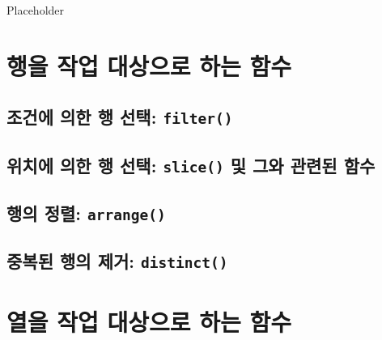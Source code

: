 \documentclass[
]{book}
\begin{document}
Placeholder

\hypertarget{uxd589uxc744-uxc791uxc5c5-uxb300uxc0c1uxc73cuxb85c-uxd558uxb294-uxd568uxc218}{%
\section{행을 작업 대상으로 하는 함수}\label{uxd589uxc744-uxc791uxc5c5-uxb300uxc0c1uxc73cuxb85c-uxd558uxb294-uxd568uxc218}}

\hypertarget{uxc870uxac74uxc5d0-uxc758uxd55c-uxd589-uxc120uxd0dd-filter}{%
\subsection{\texorpdfstring{조건에 의한 행 선택: \texttt{filter()}}{조건에 의한 행 선택: filter()}}\label{uxc870uxac74uxc5d0-uxc758uxd55c-uxd589-uxc120uxd0dd-filter}}

\hypertarget{uxc704uxce58uxc5d0-uxc758uxd55c-uxd589-uxc120uxd0dd-slice-uxbc0f-uxadf8uxc640-uxad00uxb828uxb41c-uxd568uxc218}{%
\subsection{\texorpdfstring{위치에 의한 행 선택: \texttt{slice()} 및 그와 관련된 함수}{위치에 의한 행 선택: slice() 및 그와 관련된 함수}}\label{uxc704uxce58uxc5d0-uxc758uxd55c-uxd589-uxc120uxd0dd-slice-uxbc0f-uxadf8uxc640-uxad00uxb828uxb41c-uxd568uxc218}}

\hypertarget{uxd589uxc758-uxc815uxb82c-arrange}{%
\subsection{\texorpdfstring{행의 정렬: \texttt{arrange()}}{행의 정렬: arrange()}}\label{uxd589uxc758-uxc815uxb82c-arrange}}

\hypertarget{uxc911uxbcf5uxb41c-uxd589uxc758-uxc81cuxac70-distinct}{%
\subsection{\texorpdfstring{중복된 행의 제거: \texttt{distinct()}}{중복된 행의 제거: distinct()}}\label{uxc911uxbcf5uxb41c-uxd589uxc758-uxc81cuxac70-distinct}}

\hypertarget{uxc5f4uxc744-uxc791uxc5c5-uxb300uxc0c1uxc73cuxb85c-uxd558uxb294-uxd568uxc218}{%
\section{열을 작업 대상으로 하는 함수}\label{uxc5f4uxc744-uxc791uxc5c5-uxb300uxc0c1uxc73cuxb85c-uxd558uxb294-uxd568uxc218}}
\end{document}
